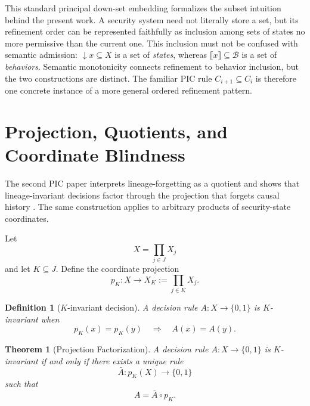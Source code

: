 \documentclass[10pt,twocolumn]{article}
\newcommand{\sem}[1]{\llbracket #1 \rrbracket}
\newtheorem{definition}{Definition}
\newtheorem{theorem}{Theorem}
\begin{document}
This standard principal down-set embedding formalizes the subset intuition
behind the present work. A security system need not literally store a set, but
its refinement order can be represented faithfully as inclusion among sets of
states no more permissive than the current one. This inclusion must not be
confused with semantic admission: $\downarrow x\subseteq X$ is a set of
\emph{states}, whereas $\sem{x}\subseteq\mathcal{B}$ is a set of
\emph{behaviors}. Semantic monotonicity connects refinement to behavior
inclusion, but the two constructions are distinct. The familiar PIC rule
$C_{i+1}\subseteq C_i$ is therefore one concrete instance of a more general
ordered refinement pattern.

\section{Projection, Quotients, and Coordinate Blindness}

The second PIC paper interprets lineage-forgetting as a quotient and shows that
lineage-invariant decisions factor through the projection that forgets causal
history \cite{gallo_relational2026}.  The same construction applies to arbitrary
products of security-state coordinates.

Let
\begin{equation}
  X=\prod_{j\in J}X_j
\end{equation}
and let $K\subseteq J$.  Define the coordinate projection
\begin{equation}
  p_K:X\to X_K:=\prod_{j\in K}X_j.
\end{equation}

\begin{definition}[$K$-invariant decision]
A decision rule $A:X\to\{0,1\}$ is $K$-invariant when
\begin{equation}
  p_K(x)=p_K(y)
  \quad\Longrightarrow\quad
  A(x)=A(y).
\end{equation}
\end{definition}

\begin{theorem}[Projection Factorization]
A decision rule $A:X\to\{0,1\}$ is $K$-invariant if and only if there exists a
unique rule
\begin{equation}
  \bar A:p_K(X)\to\{0,1\}
\end{equation}
such that
\begin{equation}
  A=\bar A\circ p_K.
  \label{eq:factorization}
\end{equation}
\end{theorem}
\end{document}
